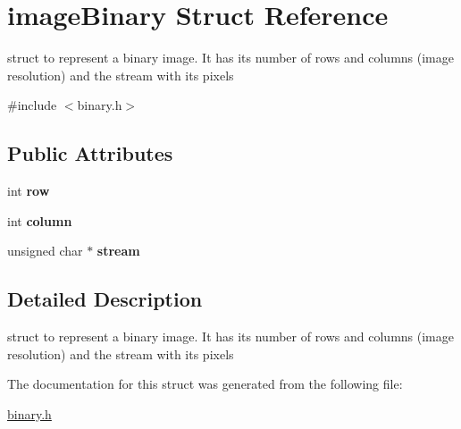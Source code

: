 \hypertarget{structimageBinary}{}\section{image\+Binary Struct Reference}
\label{structimageBinary}


struct to represent a binary image. It has its number of rows and columns (image resolution) and the stream with its pixels  




{\ttfamily \#include $<$binary.\+h$>$}

\subsection*{Public Attributes}
\begin{DoxyCompactItemize}
\item 
\mbox{\label{structimageBinary_abdfc9ba7108a118f3d2bede8480067b1}} 
int {\bfseries row}
\item 
\mbox{\label{structimageBinary_a2a4c018ca3e95bf500b3f480ed24eb1c}} 
int {\bfseries column}
\item 
\mbox{\label{structimageBinary_a8e6618844a6b7954f842186671611fd2}} 
unsigned char $\ast$ {\bfseries stream}
\end{DoxyCompactItemize}


\subsection{Detailed Description}
struct to represent a binary image. It has its number of rows and columns (image resolution) and the stream with its pixels 

The documentation for this struct was generated from the following file\+:\begin{DoxyCompactItemize}
\item 
\hyperlink{binary_8h}{binary.\+h}\end{DoxyCompactItemize}
